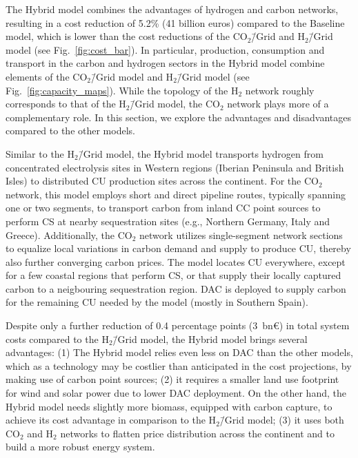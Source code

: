 \documentclass[twocolumn]{article}
\newcommand{\COtwo}{CO$_2$}
\newcommand{\Htwo}{H$_2$}
\newcommand{\COgrid}{CO$_2$\=/Grid}
\newcommand{\modBase}{Baseline model}
\newcommand{\modH}{H$_2$\=/Grid model}
\newcommand{\modHybrid}{Hybrid model}
\newcommand{\carbonmodel}{CO$_2$\=/Grid model}
\newcommand{\hydrogenmodel}{H$_2$\=/Grid model}
\begin{document}
The \modHybrid{} combines the advantages of hydrogen and carbon networks, resulting in a cost reduction of \label{}5.2\% (\label{}41 billion euros) compared to the \modBase{}, which is lower than the cost reductions of the \COgrid{} and \modH{} (see Fig.~\ref{fig:cost_bar}). In particular, production, consumption and transport in the carbon and hydrogen sectors in the \modHybrid{} combine elements of the \carbonmodel{} and \hydrogenmodel{} (see Fig.~\ref{fig:capacity_maps}). While the topology of the \Htwo{} network roughly corresponds to that of the \modH{}, the \COtwo{} network plays more of a complementary role. In this section, we explore the advantages and disadvantages compared to the other models.

Similar to the \modH{}, the \modHybrid{} transports hydrogen from concentrated electrolysis sites in Western regions (Iberian Peninsula and British Isles) to distributed CU production sites across the continent. For the \COtwo{} network, this model employs short and direct pipeline routes, typically spanning one or two segments, to transport carbon from inland CC point sources to perform CS at nearby sequestration sites (e.g., Northern Germany, Italy and Greece). Additionally, the \COtwo{} network utilizes single-segment network sections to equalize local variations in carbon demand and supply to produce CU, thereby also further converging carbon prices. The model locates CU everywhere, except for a few coastal regions that perform CS, or that supply their locally captured carbon to a neigbouring sequestration region. DAC is deployed to supply carbon for the remaining CU needed by the model (mostly in Southern Spain).

Despite only a further reduction of \label{}0.4 percentage points (\label{}3~bn€) in total system costs compared to the \modH{}, the \modHybrid{} brings several advantages: (1) The \modHybrid{} relies even less on DAC than the other models, which as a technology may be costlier than anticipated in the cost projections, by making use of carbon point sources; (2) it requires a smaller land use footprint for wind and solar power due to lower DAC deployment. On the other hand, the \modHybrid{} needs slightly more biomass, equipped with carbon capture, to achieve its cost advantage in comparison to the \modH{}; (3) it uses both \COtwo{} and \Htwo{} networks to flatten price distribution across the continent and to build a more robust energy system.
\end{document}
